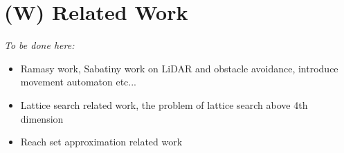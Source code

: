 \section{(W) Related Work}\label{s:relatedWork}
    \emph{To be done here:}
    \begin{itemize}
        \item Ramasy work, Sabatiny work on LiDAR and obstacle avoidance, introduce movement automaton etc...
        \item Lattice search related work, the problem of lattice search above 4th dimension
        \item Reach set approximation related work
    \end{itemize}